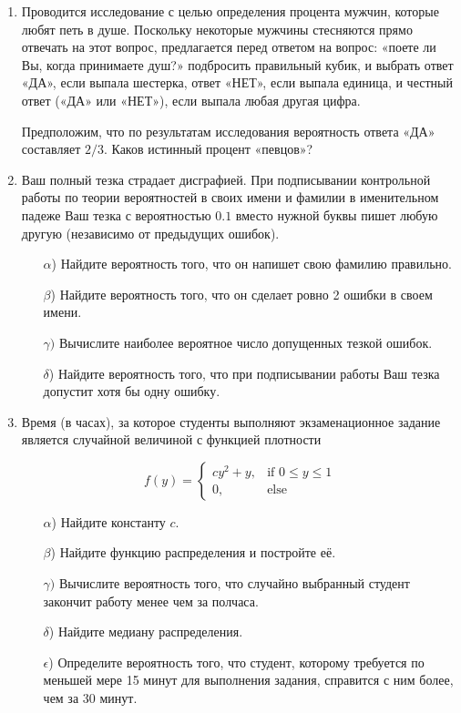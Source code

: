 \begin{enumerate}
\item
Проводится исследование с целью определения процента мужчин, которые любят
петь в душе. Поскольку некоторые мужчины стесняются прямо отвечать на этот
вопрос, предлагается перед ответом на вопрос: «поете ли Вы, когда принимаете
душ?» подбросить правильный кубик, и выбрать ответ «ДА», если выпала
шестерка, ответ «НЕТ», если выпала единица, и честный ответ («ДА» или «НЕТ»),
если выпала любая другая цифра.

Предположим, что по результатам исследования
вероятность ответа «ДА» составляет $2/3$. Каков истинный процент «певцов»?

\item
Ваш полный тезка страдает дисграфией. При подписывании контрольной работы
по теории вероятностей в своих имени и фамилии в именительном падеже Ваш
тезка с вероятностью $0.1$ вместо нужной буквы пишет любую другую (независимо
от предыдущих ошибок).

\begin{enumerate}
    \item[$\alpha$)] Найдите вероятность того, что он напишет свою фамилию правильно.
    \item[$\beta$)] Найдите вероятность того, что он сделает ровно 2 ошибки в своем имени.
    \item[$\gamma)$] Вычислите наиболее вероятное число допущенных тезкой ошибок.
    \item[$\delta$)] Найдите вероятность того, что при подписывании работы Ваш тезка
    допустит хотя бы одну ошибку.
\end{enumerate}

\item
Время (в часах), за которое студенты выполняют экзаменационное задание
является случайной величиной с функцией плотности

\[
f(y) =
\begin{cases}
cy^2 + y , & \mbox{if } 0 \le y \le 1 \\
0, & \mbox{else}
\end{cases}
\]

\begin{enumerate}
    \item[$\alpha$)] Найдите константу $c$.
    \item[$\beta$)]  Найдите функцию распределения и постройте её.
    \item[$\gamma)$] Вычислите вероятность того, что случайно выбранный студент
    закончит работу менее чем за полчаса.
    \item[$\delta$)] Найдите медиану распределения.
    \item[$\epsilon$)] Определите вероятность того, что студент, которому требуется
    по меньшей мере 15 минут для выполнения задания, справится с ним более, чем за 30 минут.
\end{enumerate}


\end{enumerate}
